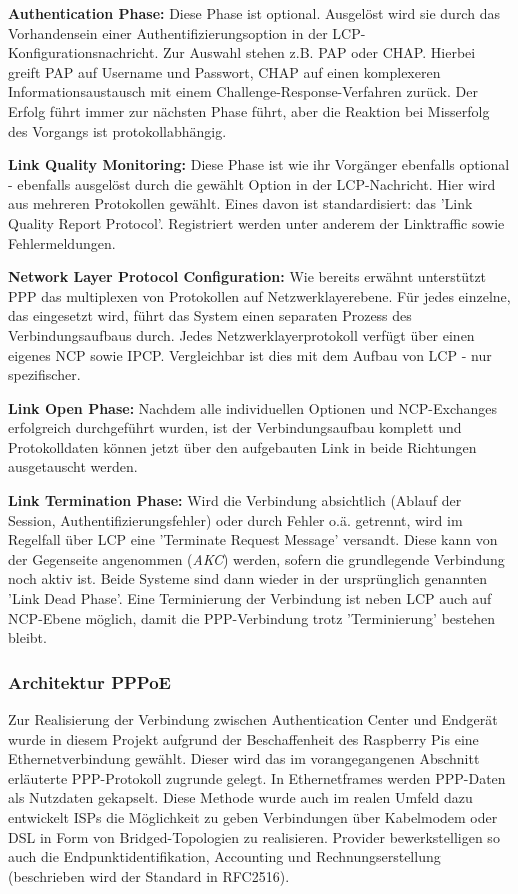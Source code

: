 \textbf{Authentication Phase:}
Diese Phase ist optional. Ausgelöst wird sie durch das Vorhandensein einer
Authentifizierungsoption in der LCP-Konfigurationsnachricht.
Zur Auswahl stehen z.B. \ac{PAP} oder \ac{CHAP}.
Hierbei greift PAP auf Username und Passwort, CHAP auf einen komplexeren Informationsaustausch
mit einem Challenge-Response-Verfahren zurück. Der Erfolg führt immer zur nächsten
Phase führt, aber die Reaktion bei Misserfolg des Vorgangs ist protokollabhängig.

\textbf{Link Quality Monitoring:}
Diese Phase ist wie ihr Vorgänger ebenfalls optional - ebenfalls ausgelöst durch
die gewählt Option in der LCP-Nachricht.
Hier wird aus mehreren Protokollen gewählt. Eines davon ist standardisiert:
das 'Link Quality Report Protocol'. Registriert werden unter anderem der Linktraffic
sowie Fehlermeldungen.

\textbf{Network Layer Protocol Configuration:}
Wie bereits erwähnt unterstützt PPP  das multiplexen von Protokollen auf
Netzwerklayerebene. Für jedes einzelne, das eingesetzt wird,
führt das System einen separaten Prozess des Verbindungsaufbaus durch.
Jedes Netzwerklayerprotokoll verfügt über einen eigenes \ac{NCP} sowie \ac{IPCP}.
Vergleichbar ist dies mit dem Aufbau von \ac{LCP} - nur spezifischer.

\textbf{Link Open Phase:}
Nachdem alle individuellen Optionen und NCP-Exchanges erfolgreich durchgeführt wurden,
ist der Verbindungsaufbau komplett und Protokolldaten können jetzt über den aufgebauten
Link in beide Richtungen ausgetauscht werden.

\textbf{Link Termination Phase:}
Wird die Verbindung absichtlich (Ablauf der Session, Authentifizierungsfehler)
oder durch Fehler o.ä. getrennt, wird im Regelfall über \ac{LCP}
eine 'Terminate Request Message' versandt. Diese kann von der Gegenseite
angenommen (\textit{AKC}) werden, sofern die grundlegende Verbindung noch aktiv ist.
Beide Systeme sind dann wieder in der ursprünglich genannten 'Link Dead Phase'.
Eine Terminierung der Verbindung ist neben \ac{LCP} auch auf \ac{NCP}-Ebene möglich,
damit die PPP-Verbindung trotz 'Terminierung' bestehen bleibt.


\subsubsection{Architektur PPPoE}\label{subsubsection:architecture_pppoe}
Zur Realisierung der Verbindung zwischen Authentication Center und
Endgerät wurde in diesem Projekt aufgrund der Beschaffenheit des Raspberry Pis eine
Ethernetverbindung gewählt. Dieser wird das im vorangegangenen
Abschnitt erläuterte \ac{PPP}-Protokoll zugrunde gelegt.
In Ethernetframes werden PPP-Daten als Nutzdaten gekapselt.
Diese Methode wurde auch im realen Umfeld dazu entwickelt \acp{ISP} die
Möglichkeit zu geben Verbindungen über Kabelmodem oder DSL in Form
von Bridged-Topologien zu realisieren. Provider bewerkstelligen
so auch die Endpunktidentifikation, Accounting und Rechnungserstellung
(beschrieben wird der Standard in RFC2516).

